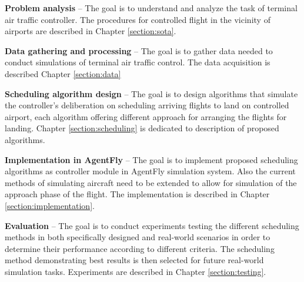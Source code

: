 \benum
\item \textbf{Problem analysis} – The goal is to understand and analyze the task of terminal air traffic controller. The procedures for controlled flight in the vicinity of airports are described in Chapter \ref{section:sota}.
\item \textbf{Data gathering and processing} – The goal is to gather data needed to conduct simulations of terminal air traffic control. The data acquisition is described Chapter \ref{section:data}
\item \textbf{Scheduling algorithm design} – The goal is to design algorithms that simulate the controller's deliberation on scheduling arriving flights to land on controlled airport, each algorithm offering different approach for arranging the flights for landing. Chapter \ref{section:scheduling} is dedicated to description of proposed algorithms.
\item \textbf{Implementation in AgentFly} – The goal is to implement proposed scheduling algorithms as controller module in AgentFly simulation system. Also the current methods of simulating aircraft need to be extended to allow for simulation of the approach phase of the flight. The implementation is described in Chapter \ref{section:implementation}.
\item \textbf{Evaluation} – The goal is to conduct experiments testing the different scheduling methods in both specifically designed and real-world scenarios in order to determine their performance according to different criteria. The scheduling method demonstrating best results is then selected for future real-world simulation tasks. Experiments are described in Chapter \ref{section:testing}.
\eenum